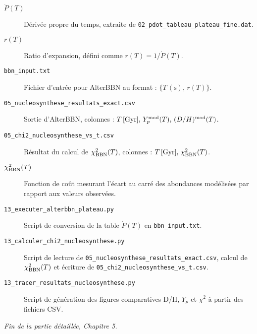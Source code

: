 \begin{description}
  \item[\(\dot P(T)\)] Dérivée propre du temps, extraite de \texttt{02\_pdot\_tableau\_plateau\_fine.dat}.
  \item[\(r(T)\)] Ratio d’expansion, défini comme \(r(T)=1/\dot P(T)\).
  \item[\texttt{bbn\_input.txt}] Fichier d’entrée pour AlterBBN au format :
    \(\{T\,(\mathrm{s}),\,r(T)\}\).
  \item[\texttt{05\_nucleosynthese\_resultats\_exact.csv}] Sortie d’AlterBBN, colonnes :
    \(T\,[\mathrm{Gyr}],\,Y_{p}^{\rm mod}(T),\,(D/H)^{\rm mod}(T)\).
  \item[\texttt{05\_chi2\_nucleosynthese\_vs\_t.csv}] Résultat du calcul de \(\chi^{2}_{\rm BBN}(T)\),
    colonnes : \(T\,[\mathrm{Gyr}],\,\chi^{2}_{\rm BBN}(T)\).
  \item[\(\chi^{2}_{\rm BBN}(T)\)] Fonction de coût mesurant l’écart au carré des abondances modélisées
    par rapport aux valeurs observées.
  \item[\texttt{13\_executer\_alterbbn\_plateau.py}] Script de conversion de la table \(\dot P(T)\) en
    \texttt{bbn\_input.txt}.
  \item[\texttt{13\_calculer\_chi2\_nucleosynthese.py}] Script de lecture de \texttt{05\_nucleosynthese\_resultats\_exact.csv},
    calcul de \(\chi^{2}_{\rm BBN}(T)\) et écriture de \texttt{05\_chi2\_nucleosynthese\_vs\_t.csv}.
  \item[\texttt{13\_tracer\_resultats\_nucleosynthese.py}] Script de génération des figures comparatives D/H, \(Y_{p}\) et
    \(\chi^{2}\) à partir des fichiers CSV.
\end{description}

\bigskip
\noindent\emph{Fin de la partie détaillée, Chapitre 5.}
